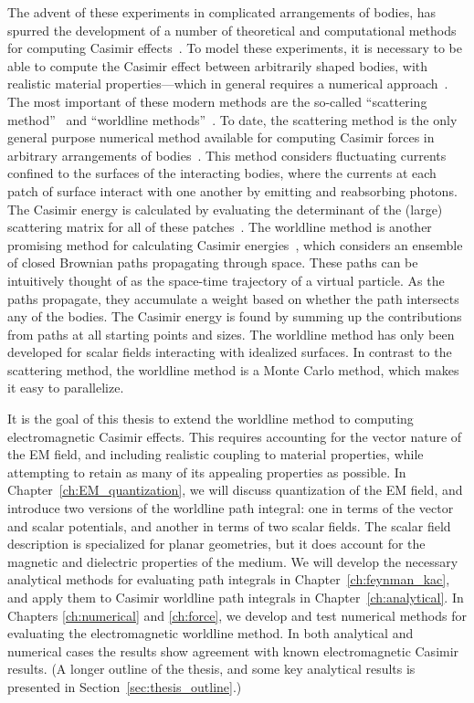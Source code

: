 The advent of these experiments in complicated arrangements of bodies, has spurred the development
of a number of theoretical and computational methods for computing Casimir effects~\citep{Dalvit2011,Bordag2009}. 
To model these experiments, it is necessary to be able to compute the Casimir effect between arbitrarily shaped bodies, with 
realistic material properties---which in general requires a numerical approach~\citep{Johnson2011}.
The most important of these modern methods are the so-called ``scattering method''~\citep{Lambrecht2006,Rahi2009,Reid2009}
 and ``worldline methods''~\citep{Gies2003}.
To date, the scattering method is the only general purpose numerical method available for computing
Casimir forces in arbitrary arrangements of bodies~\citep{Reid2009,Reid2011,Reid2013}.  
This method considers fluctuating currents confined to the surfaces of the interacting bodies,
where the currents at each patch of surface interact with one another by emitting and reabsorbing photons.
The Casimir energy is calculated by evaluating the determinant of the (large) scattering matrix for all of these patches~\citep{Reid2011}.  
The worldline method is another promising method for calculating Casimir energies~\citep{Gies2003},
which considers an ensemble of closed Brownian paths propagating through space.
These paths can be intuitively thought of as the space-time trajectory of a virtual particle.
As the paths propagate, they accumulate a weight based on whether the path intersects any of the 
bodies.  The Casimir energy is found by summing up the contributions from paths at all starting points
and sizes.   
The worldline method has only been developed for scalar fields interacting with idealized surfaces.
In contrast to the scattering method, the worldline method is a Monte Carlo method, which makes it 
easy to parallelize.  

It is the goal of this thesis to extend the worldline method to computing electromagnetic Casimir effects.
This requires accounting for the vector nature of the EM field, and including realistic coupling to 
material properties, while attempting to retain as many of its appealing properties as possible.    
In Chapter~\ref{ch:EM_quantization}, we will discuss quantization of the EM field, and introduce
two versions of the worldline path integral: one in terms of the vector and scalar potentials, and another 
in terms of two scalar fields.  The scalar field description is specialized for planar geometries, 
but it does account for the magnetic and dielectric properties of the medium.
We will develop the necessary analytical methods for evaluating path integrals in Chapter~\ref{ch:feynman_kac},
and apply them to Casimir worldline path integrals in Chapter~\ref{ch:analytical}.
In Chapters \ref{ch:numerical} and \ref{ch:force}, we develop and test numerical methods for evaluating 
the electromagnetic worldline method.
In both analytical and numerical cases the results show agreement with known electromagnetic Casimir results.
(A longer outline of the thesis, and some key analytical results is presented in Section~\ref{sec:thesis_outline}.)

